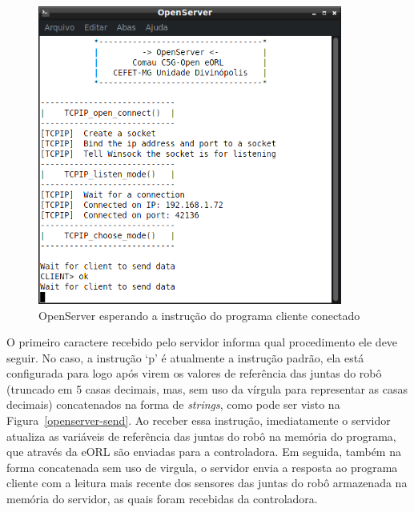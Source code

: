             \begin{figure}[ht]
                \centering
                \includegraphics[width=10cm]{imagens/Softwares/openserver-ok_.png}
                \small 
                \centering 
                \caption{OpenServer esperando a instrução do programa cliente conectado}
                \label{openserver-ok}
            \end{figure}
            
            O primeiro caractere recebido pelo servidor informa qual procedimento ele deve seguir. No caso, a instrução `p' é atualmente a instrução padrão, ela está configurada para logo após virem os valores de referência das juntas do robô (truncado em 5 casas decimais, mas, sem uso da vírgula para representar as casas decimais) concatenados na forma de \textit{strings}, como pode ser visto na Figura~\ref{openserver-send}. Ao receber essa instrução, imediatamente o servidor atualiza as variáveis de referência das juntas do robô na memória do programa, que através da \ac{eORL} são enviadas para a controladora. Em seguida, também na forma concatenada sem uso de virgula, o servidor envia a resposta ao programa cliente com a leitura mais recente dos sensores das juntas do robô armazenada na memória do servidor, as quais foram recebidas da controladora.
            
